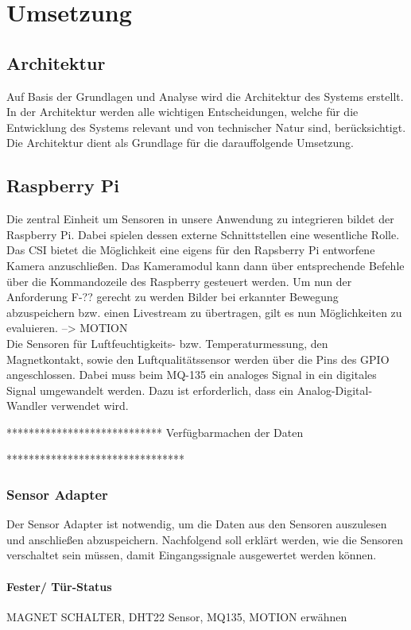 \chapter{Umsetzung} \label{sec:Umsetzung}

\section{Architektur}
Auf Basis der Grundlagen und Analyse wird die Architektur des Systems erstellt.
In der Architektur werden alle wichtigen Entscheidungen, welche für die
Entwicklung des Systems relevant und von technischer Natur sind, berücksichtigt. Die Architektur dient als Grundlage für die darauffolgende Umsetzung.

\section{Raspberry Pi}
Die zentral Einheit um Sensoren in unsere Anwendung zu integrieren bildet der Raspberry Pi. Dabei spielen dessen externe Schnittstellen eine wesentliche Rolle. \\Das \acf{CSI}
bietet die Möglichkeit eine eigens für den Rapsberry Pi entworfene Kamera anzuschließen. Das Kameramodul kann dann über entsprechende Befehle über die Kommandozeile des Raspberry gesteuert werden. Um nun der Anforderung F-?? gerecht zu werden Bilder bei erkannter Bewegung abzuspeichern bzw. einen Livestream zu übertragen, gilt es nun Möglichkeiten zu evaluieren. 
--> MOTION
\\Die Sensoren für Luftfeuchtigkeits- bzw. Temperaturmessung, den Magnetkontakt, sowie den Luftqualitätssensor werden über die Pins des \ac{GPIO} angeschlossen. Dabei muss beim MQ-135 ein analoges Signal in ein digitales Signal umgewandelt werden. Dazu ist erforderlich, dass ein Analog-Digital-Wandler verwendet wird. 

****************************
Verfügbarmachen der Daten 


********************************

\subsection{Sensor Adapter}
Der Sensor Adapter ist notwendig, um die Daten aus den Sensoren auszulesen und anschließen abzuspeichern. Nachfolgend soll erklärt werden, wie die Sensoren verschaltet sein müssen, damit Eingangssignale ausgewertet werden können. 

\subsubsection{Fester/ Tür-Status}
MAGNET SCHALTER, DHT22 Sensor, MQ135, MOTION erwähnen


